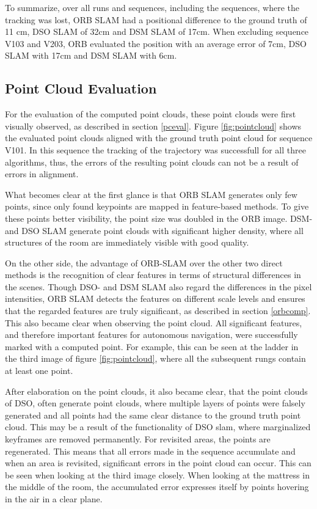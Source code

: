 	To summarize, over all runs and sequences, including the sequences, where the tracking was lost, ORB SLAM had a positional difference to the ground truth 
	of 11 cm, DSO SLAM of 32cm and DSM SLAM of 17cm. When excluding sequence V103 and V203, ORB evaluated the position with an average error of 7cm, DSO SLAM with 17cm and DSM SLAM with 6cm. 
	
\subsection{Point Cloud Evaluation}

For the evaluation of the computed point clouds, these point clouds were first visually observed, as described in section \ref{pceval}. 
Figure \ref{fig:pointcloud} shows the evaluated point clouds aligned with the ground truth point cloud for sequence V101. In this sequence
 the tracking of the trajectory was successfull for all three algorithms, thus, the errors of the resulting point clouds can not 
be a result of errors in alignment. 

What becomes clear at the first glance is that ORB SLAM generates only few points, since only found keypoints are mapped in feature-based methods.
 To give these  points better visibility, the point size was doubled in the ORB image. DSM- and DSO SLAM generate point clouds with significant higher 
 density, where all structures of the room are immediately visible with good quality. 
 
 On the other side, the advantage of ORB-SLAM over the other two direct methods 
 is the recognition of clear features in terms of structural differences in the scenes. Though DSO- and DSM SLAM also regard the differences in the pixel intensities, ORB SLAM detects the features on different scale levels and ensures that the regarded features are truly significant, as described in section \ref{orbcomp}.
 This also became clear when observing the point cloud. All significant features, and therefore important features for autonomous navigation, were successfully 
 marked with a computed point. For example, this can be seen at the ladder in the third image of figure \ref{fig:pointcloud}, where all the subsequent rungs contain at least 
 one point. 
 
 After elaboration on the point clouds, it also became clear, that the point clouds of DSO, often generate point clouds, where multiple layers of 
 points were falsely generated and all points had the same clear distance to the ground truth point cloud. This may be a result of the functionality of DSO slam, 
 where marginalized keyframes are removed permanently. For revisited areas, the points are regenerated. This means that all errors made
 in the sequence accumulate and when an area is revisited, significant errors in the point cloud can occur. This can be seen when looking at the 
 third image closely. When looking at the mattress in the middle of the room, the accumulated error expresses itself by points hovering in the air 
 in a clear plane. 

